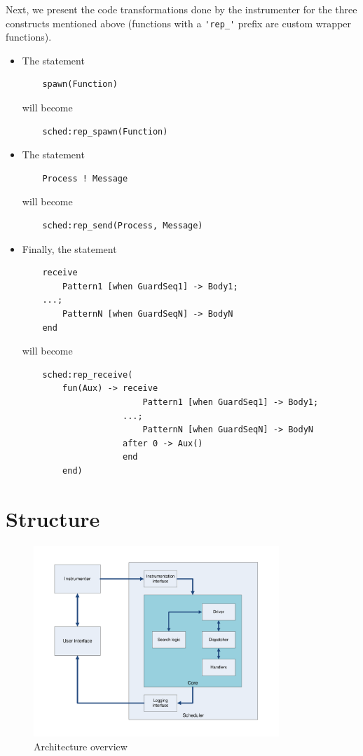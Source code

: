 \documentclass[a4paper,10pt]{article}
\begin{document}
Next, we present the code transformations done by the instrumenter for the three constructs mentioned above
(functions with a \lstinline+'rep_'+ prefix are custom wrapper functions).

\begin{itemize}
	\item The statement
	\begin{lstlisting}
    spawn(Function)
	\end{lstlisting}
	will become
	\begin{lstlisting}
    sched:rep_spawn(Function)
	\end{lstlisting}
	
	\item The statement
	\begin{lstlisting}
    Process ! Message
	\end{lstlisting}
	will become
	\begin{lstlisting}
    sched:rep_send(Process, Message)
	\end{lstlisting}
	
	\item Finally, the statement
	\begin{lstlisting}
    receive
        Pattern1 [when GuardSeq1] -> Body1;
    ...;
        PatternN [when GuardSeqN] -> BodyN
    end
	\end{lstlisting}
	will become
	\begin{lstlisting}
    sched:rep_receive(
        fun(Aux) -> receive
                        Pattern1 [when GuardSeq1] -> Body1;
                    ...;
                        PatternN [when GuardSeqN] -> BodyN
                    after 0 -> Aux()
                    end
        end)
	\end{lstlisting}
\end{itemize}

\section{Structure}

\begin{figure}[htb]
	\centering
	\includegraphics[width=350px]{pra1_arch}
	\caption{Architecture overview}
\end{figure}
\end{document}
